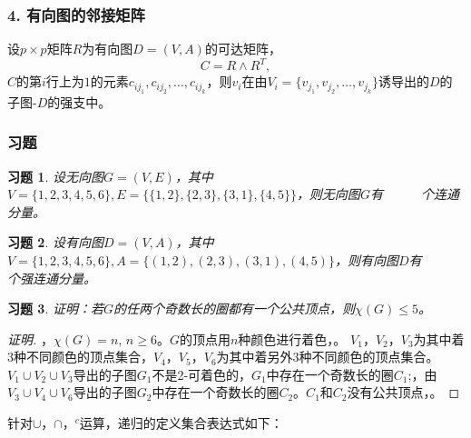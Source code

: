 \documentclass{beamer}
\begin{document}
\begin{CJK*}{UTF8}{gbsn}
\begin{frame}
  \frametitle{4. 有向图的邻接矩阵}
  \begin{Thm}\justifying\let\raggedright\justifying
   设$p \times p$矩阵$R$为有向图$D=(V,A)$的可达矩阵， \[C=R \land R^T,\] $C$的第$i$行上为$1$的元素$c_{ij_1}, c_{ij_2}, \ldots, c_{ij_k}$，则$v_i$在由$V_i= \{v_{j_1}, v_{j_2}, \ldots, v_{j_k}\}$诱导出的$D$的子图-$D$的强支中。
 \end{Thm}
  \centering
\end{frame}


\newtheorem{Exercise}{习题}

\begin{frame}
  \frametitle{习题}
  \begin{Exercise}\justifying\let\raggedright\justifying
    设无向图$G=(V,E)$，其中$V=\{1,2,3,4,5,6\}, E = \{\{1,2\},\{2,3\},\{3,1\},
    \{4,5\}\}$，则无向图$G$有\underline{$\quad\quad\quad$}个连通分量。
  \end{Exercise}
    \begin{Exercise}\justifying\let\raggedright\justifying
    设有向图$D=(V,A)$，其中$V=\{1,2,3,4,5,6\}, A =\{(1,2),(2,3),(3,1),
    (4,5)\}$，则有向图$D$有\underline{$\quad\quad\quad$}个强连通分量。
  \end{Exercise}

\end{frame}
\begin{frame}
  \begin{Exercise}
    证明：若$G$的任两个奇数长的圈都有一个公共顶点，则$\chi(G)\leq 5$。
  \end{Exercise}
  \pause\begin{proof}[证明]\justifying\let\raggedright\justifying
  ，$\chi(G)=n$, $n \geq 6$。$G$的顶点用$n$种颜色进行着色，。
  $V_1$，$V_2$，$V_3$为其中着3种不同颜色的顶点集合，\pause$V_4$，$V_5$，$V_6$为其中着另外3种不同颜色的顶点集合。$V_1\cup V_2\cup V_3$导出的子图$G_1$不是2-可着色的，$G_1$中存在一个奇数长的圈$C_1$;，由$V_3\cup V_4\cup V_6$导出的子图$G_2$中存在一个奇数长的圈$C_2$。\pause$C_1$和$C_2$没有公共顶点，。
\end{proof}
\end{frame}
\begin{frame}
  \begin{Def1}
    针对$\cup$，$\cap$，$^c$运算，递归的定义集合表达式如下：


\end{Def1}
\end{frame}
\end{CJK*}
\end{document}
